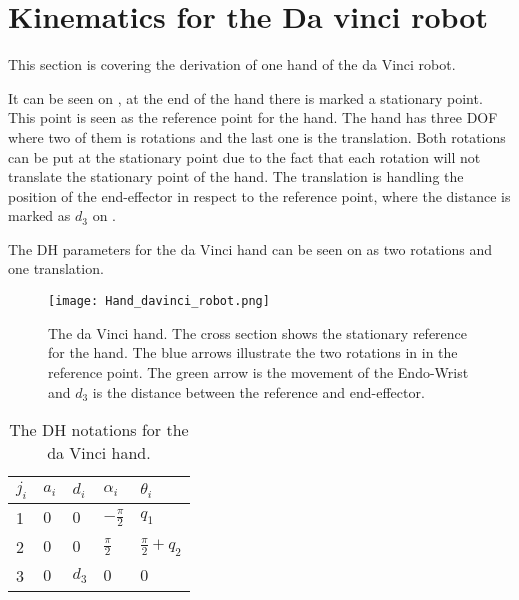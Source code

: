 \section{Kinematics for the Da vinci robot}
This section is covering the derivation of one hand of the da Vinci robot.

It can be seen on , at the end of the hand there is marked a stationary point. This point is seen as the reference point for the hand. The hand has three DOF where two of them is rotations and the last one is the translation. Both rotations can be put at the stationary point due to the fact that each rotation will not translate the stationary point of the hand. The translation is handling the position of the end-effector in respect to the reference point, where the distance is marked as $d_3$ on .

The DH parameters for the da Vinci hand can be seen on  as two rotations and one translation.

\begin{figure}[H]
		\centering
		\texttt{[image: Hand\_davinci\_robot.png]}
		\caption{The da Vinci hand. The cross section shows the stationary reference for the hand. The blue arrows illustrate the two rotations in in the reference point. The green arrow is the movement of the Endo-Wrist and $d_3$ is the distance between the reference and end-effector.}
		\label{fig:da_hand_kino}
\end{figure}


\begin{table}[H]
\centering
\begin{tabular}{|l|l|l|l|l|}
	\hline
 	$j_i$ 	  & $a_i$    & $d_i$ & $\alpha_i$ 		 & $\theta_i$ 			   	 \\ \hline
 	1  	  	  &  $0$     & $0$ 	 & $-\frac{\pi}{2}$	 		 & $q_1$ 			    	 \\ \hline
 	2  		  &  $0$   	 & $0$ 	 & $ \frac{\pi}{2}$ 	 & $\frac{\pi}{2}+q_2$ 		 \\ \hline
 	3 	 	  &  $0$	 & $d_3$ & $0$ 		 		 & $0$ 					 \\ \hline
\end{tabular}
\caption{The DH notations for the da Vinci hand.}
\label{tab:DH_notation_hand}
\end{table}


